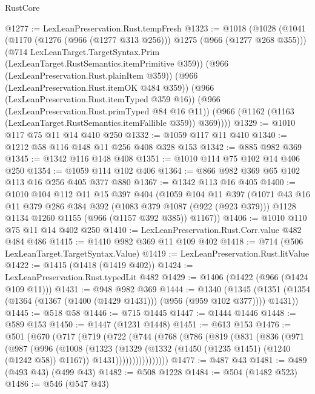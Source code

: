 \begin{lexlean}{RustCore}
\begin{coremodule}
@1277 := LexLeanPreservation.Rust.tempFresh
@1323 := @1018
    (@1028
      (@1041
        (@1170 (@1276 (@966 (@1277 @313 @256))) @1275 (@966 (@1277 @268 @355)))
        (@714 LexLeanTarget.TargetSyntax.Prim (LexLeanTarget.RustSemantics.itemPrimitive @359))
        (@966 (LexLeanPreservation.Rust.plainItem @359))
        (@966 (LexLeanPreservation.Rust.itemOK @484 @359))
        (@966 (LexLeanPreservation.Rust.itemTyped @359 @16))
        (@966 (LexLeanPreservation.Rust.primTyped @84 @16 @11))
        (@966 (@1162 (@1163 (LexLeanTarget.RustSemantics.itemFallible @359)) @369))))
@1329 := @1010 @117 @75 @11 @14 @410 @250
@1332 := @1059 @117 @11 @410
@1340 := @1212 @58 @116 @148 @11 @256 @408 @328 @153
@1342 := @885 @982 @369
@1345 := @1342 @116 @148 @408
@1351 := @1010 @114 @75 @102 @14 @406 @250
@1354 := @1059 @114 @102 @406
@1364 := @866 @982 @369 @65 @102 @113 @16 @256 @405 @377 @880
@1367 := @1342 @113 @16 @405
@1400 := @1010
    @104
    @112
    @11
    @15
    @397
    @404
    (@1059
      @104
      @11
      @397
      (@1071
        @43
        @16
        @11
        @379
        @286
        @384
        @392
        (@1083 @379 @1087 (@922 (@923 @379)))
        @1128
        @1134
        @1260
        @1155
        (@966 (@1157 @392 @385))
        @1167))
@1406 := @1010 @110 @75 @11 @14 @402 @250
@1410 := LexLeanPreservation.Rust.Corr.value @482 @484 @486
@1415 := @1410 @982 @369 @11 @109 @402
@1418 := @714 (@506 LexLeanTarget.TargetSyntax.Value)
@1419 := LexLeanPreservation.Rust.litValue
@1422 := @1415 (@1418 (@1419 @402))
@1424 := LexLeanPreservation.Rust.typedLit @482
@1429 := @1406 (@1422 (@966 (@1424 @109 @11)))
@1431 := @948 @982 @369
@1444 := @1340
    (@1345 (@1351 (@1354 (@1364 (@1367 (@1400 (@1429 @1431))) (@956 (@959 @102 @377)))) @1431))
@1445 := @518 @58
@1446 := @715 @1445
@1447 := @1444 @1446
@1448 := @589 @153
@1450 := @1447 (@1231 @1448)
@1451 := @613 @153
@1476 := @501
    (@670
      (@717
        (@719
          (@722
            (@744
              (@768
                (@786
                  (@819
                    (@831
                      (@836
                        (@971
                          (@987
                            (@996
                              (@1008
                                (@1323
                                  (@1329
                                    (@1332 (@1450 (@1235 @1451) (@1240 (@1242 @58)) @1167))
                                    @1431))))))))))))))))
@1477 := @487 @43
@1481 := @489 (@493 @43) (@499 @43)
@1482 := @508 @1228
@1484 := @504 (@1482 @523)
@1486 := @546 (@547 @43)

\end{coremodule}
\end{lexlean}
